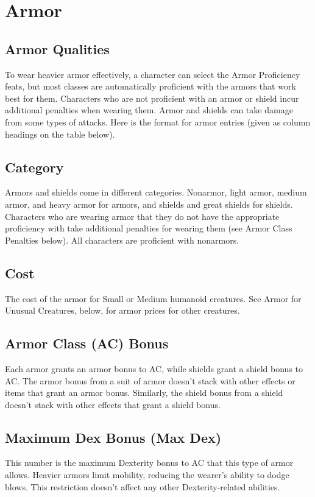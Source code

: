 \section{Armor}

\subsection{Armor Qualities}
To wear heavier armor effectively, a character can select the Armor Proficiency feats, but most classes are automatically proficient with the armors that work best for them. Characters who are not proficient with an armor or shield incur additional penalties when wearing them. Armor and shields can take damage from some types of attacks. Here is the format for armor entries (given as column headings on the table below).

\subsection{Category}
Armors and shields come in different categories. Nonarmor, light armor, medium armor, and heavy armor for armors, and shields and great shields for shields. Characters who are wearing armor that they do not have the appropriate proficiency with take additional penalties for wearing them (see Armor Class Penalties below). All characters are proficient with nonarmors.

\subsection{Cost}
The cost of the armor for Small or Medium humanoid creatures. See Armor for Unusual Creatures, below, for armor prices for other creatures.

\subsection{Armor Class (AC) Bonus}
Each armor grants an armor bonus to AC, while shields grant a shield bonus to AC. The armor bonus from a suit of armor doesn't stack with other effects or items that grant an armor bonus. Similarly, the shield bonus from a shield doesn't stack with other effects that grant a shield bonus.

\subsection{Maximum Dex Bonus (Max Dex)}
This number is the maximum Dexterity bonus to AC that this type of armor allows. Heavier armors limit mobility, reducing the wearer's ability to dodge blows. This restriction doesn't affect any other Dexterity-related abilities.

